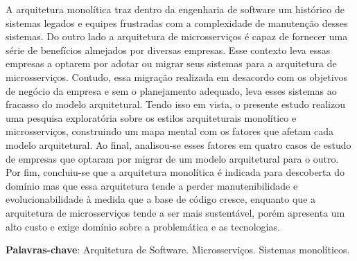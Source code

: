 \begin{resumo}
    A arquitetura monolítica traz dentro da engenharia de software um histórico de sistemas legados e
    equipes frustradas com a complexidade de manutenção desses sistemas. Do outro lado a arquitetura
    de microsserviços é capaz de fornecer uma série de benefícios almejados por diversas empresas.
    Esse contexto leva essas empresas a optarem por adotar ou migrar seus sistemas para a
    arquitetura de microsserviços. Contudo, essa migração realizada em desacordo com os objetivos de
    negócio da empresa e sem o planejamento adequado, leva esses sistemas ao fracasso do modelo
    arquitetural. Tendo isso em vista, o presente estudo realizou uma pesquisa exploratória sobre os
    estilos arquiteturais monolítico e microsserviços, construindo um mapa mental com os fatores que
    afetam cada modelo arquitetural. Ao final, analisou-se esses fatores em quatro casos de estudo de
    empresas que optaram por migrar de um modelo arquitetural para o outro. Por fim, concluiu-se que
    a arquitetura monolítica é indicada para descoberta do domínio mas que essa arquitetura tende a
    perder manutenibilidade e evolucionabilidade à medida que a base de código cresce, enquanto que
    a arquitetura de microsserviços tende a ser mais sustentável, porém apresenta um alto custo e
    exige domínio sobre a problemática e as tecnologias.
 \vspace{\onelineskip}
    
 \noindent
  \textbf{Palavras-chave}: Arquitetura de Software. Microsserviços. Sistemas monolíticos.
\end{resumo}
